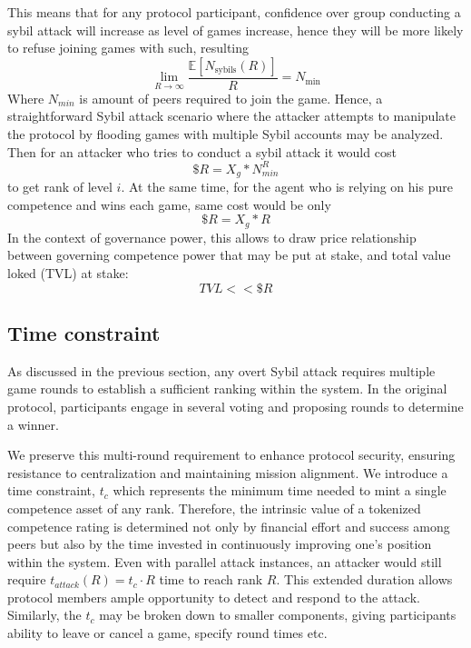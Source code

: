 \documentclass{article}
\begin{document}
\begin{CJK}{UTF8}{gbsn}
\begin{multicols}{2}
            This means that for any protocol participant, confidence over group conducting a sybil attack will increase as level of games increase, hence they will be more likely to refuse joining games with such, resulting
            \begin{equation}
                \lim_{R \to \infty} \frac{\mathbb{E}[N_{\text{sybils}}(R)]}{R} = N_{\text{min}}
            \end{equation} Where $N_{min}$ is amount of peers required to join the game. Hence, a straightforward Sybil attack scenario where the attacker attempts to manipulate the protocol by flooding games with multiple Sybil accounts may be analyzed.
            Then for an attacker who tries to conduct a sybil attack it would cost
            \begin{equation}
                \$R = X_g*N_{min}^R
            \end{equation}
            to get rank of level $i$. At the same time, for the agent who is relying on his pure competence and wins each game, same cost would be only \begin{equation}
                \$R = X_g*R
            \end{equation}
            In the context of governance power, this allows to draw price relationship between governing competence power that may be put at stake, and total value loked (TVL) at stake:
            \begin{equation}
                TVL << \$R
            \end{equation}


            \subsection{Time constraint}
            \label{sec:time-constraint}

            As discussed in the previous section, any overt Sybil attack requires multiple game rounds to establish a sufficient ranking within the system. In the original protocol, participants engage in several voting and proposing rounds to determine a winner.

            We preserve this multi-round requirement to enhance protocol security, ensuring resistance to centralization and maintaining mission alignment. We introduce a time constraint,  $t_c$ which represents the minimum time needed to mint a single competence asset of any rank.
            Therefore, the intrinsic value of a tokenized competence rating is determined not only by financial effort and success among peers but also by the time invested in continuously improving one's position within the system. Even with parallel attack instances, an attacker would still require $t_{attack}(R) = t_c \cdot R$ time to reach rank $R$. This extended duration allows protocol members ample opportunity to detect and respond to the attack. Similarly, the $t_c$ may be broken down to smaller components, giving participants ability to leave or cancel a game, specify round times etc.



\end{multicols}
\end{CJK}
\end{document}

